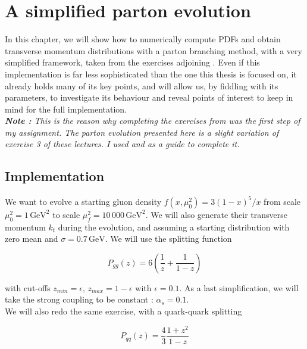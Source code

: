 \documentclass[a4paper,10pt]{report}
\begin{document}
\newpage

\chapter{A simplified parton evolution}
\label{chap:simppe}

In this chapter, we will show how to numerically compute PDFs and obtain transverse momentum 
distributions with a parton 
branching method, with a very simplified framework, taken from the exercises adjoining \cite{hj_lect}. 
Even if this implementation is far less sophisticated than the one this thesis is focused on, it 
already holds many of its key points, and will allow us, by fiddling with its parameters, to 
investigate its behaviour and reveal points of interest to keep in mind for the full implementation. \\

\textit{\textbf{Note : }This is the reason why completing the exercises from \cite{hj_lect} was the first step of 
my assignment. The parton evolution presented here is a slight variation of exercise 3 of these 
lectures. I used \cite{hj_lect} and \cite{Lelek} as a guide to complete it.}\\


    \section{Implementation}

    We want to evolve a starting gluon density $f(x, \mu_0^2) = 3(1-x)^5/x$ from scale 
    $\mu_0^2 = 1\,\text{GeV}^2$ to scale $\mu_f^2=10\,000\,\text{GeV}^2$. We will also generate 
    their transverse momentum $k_t$ during the evolution, and assuming a starting distribution 
    with zero mean and $\sigma = 0.7\,\text{GeV}$. We will use the splitting function 

    \begin{equation}
    P_{gg}(z) = 6\left(\frac{1}{z} + \frac{1}{1-z}\right)
    \label{eq:simp_pgg}
    \end{equation} 
    
    with cut-offs $z_{min} = \epsilon,\, z_{max} = 1 - \epsilon$ 
    with $\epsilon = 0.1$. As a last simplification, we will take the strong coupling to be 
    constant : $\alpha_s = 0.1$. \\ 
    We will also redo the same exercise, with a quark-quark splitting 
    
    \begin{equation}
    P_{qq}(z) = \frac{4}{3}\frac{1+z^2}{1-z}
    \label{eq:simp_pqq}
    \end{equation}
    
\end{document}
